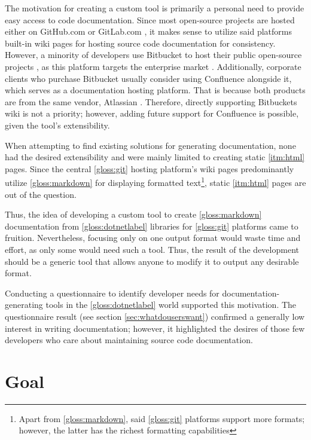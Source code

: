 The motivation for creating a custom tool is primarily a personal need to provide easy access to code documentation. Since most open-source projects are hosted either on GitHub.com or GitLab.com \cite{alphabet_inc_google_2022}, it makes sense to utilize said platforms built-in wiki pages for hosting source code documentation for consistency. However, a minority of developers use Bitbucket to host their public open-source projects \cite{jiricek_why_2022}, as this platform targets the enterprise market \cite{interviewbit_bitbucket_2022}. Additionally, corporate clients who purchase Bitbucket usually consider using Confluence alongside it, which serves as a documentation hosting platform. That is because both products are from the same vendor, Atlassian \cite{interviewbit_bitbucket_2022}. Therefore, directly supporting Bitbuckets wiki is not a priority; however, adding future support for Confluence is possible, given the tool's extensibility.

When attempting to find existing solutions for generating documentation, none had the desired extensibility and were mainly limited to creating static \ref{itm:html} pages.
Since the central \ref{gloss:git} hosting platform's wiki pages predominantly utilize \ref{gloss:markdown} for displaying formatted text\footnote{Apart from \ref{gloss:markdown}, said \ref{gloss:git} platforms support more formats; however, the latter has the richest formatting capabilities}, static \ref{itm:html} pages are out of the question.

Thus, the idea of developing a custom tool to create \ref{gloss:markdown} documentation from \ref{gloss:dotnetlabel} libraries for \ref{gloss:git} platforms came to fruition. Nevertheless, focusing only on one output format would waste time and effort, as only some would need such a tool. Thus, the result of the development should be a generic tool that allows anyone to modify it to output any desirable format.

Conducting a questionnaire to identify developer needs for documentation-generating tools in the \ref{gloss:dotnetlabel} world supported this motivation. The questionnaire result (see section \ref{sec:whatdouserswant}) confirmed a generally low interest in writing documentation; however, it highlighted the desires of those few developers who care about maintaining source code documentation.

\section*{Goal}

